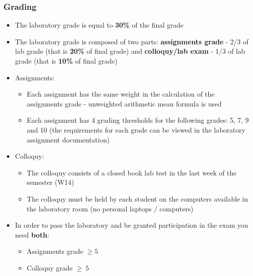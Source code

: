 \documentclass[../en-fa-lab.tex]{subfiles}
\begin{document}
\subsubsection{\texorpdfstring{\textbf{Grading}}{Grading}}\label{grading}

\begin{itemize}
\item
  The laboratory grade is equal to \textbf{30\%} of the final grade
\item
  The laboratory grade is composed of two parts: \textbf{assignments grade} - 2/3 of lab grade (that is \textbf{20\%} of final grade) and \textbf{colloquy/lab exam} - 1/3 of lab grade (that is \textbf{10\%} of final grade) 
\item Assignments:
\begin{itemize}
    \item
      Each assignment has the same weight in the calculation of the
      assignments grade - unweighted arithmetic mean formula is used
    \item
      Each assignment has 4 grading thresholds for the following grades: 5,
      7, 9 and 10 (the requirements for each grade can be viewed in the
      laboratory assignment documentation)
\end{itemize}
\item Colloquy:
\begin{itemize}
    \item The colloquy consists of a closed book lab test in the last week of the semester (W14)
    \item The colloquy must be held by each student on the computers available in the laboratory room (no personal laptops / computers) 
\end{itemize}

\item In order to pass the laboratory and be granted participation in the exam you need \textbf{both}:
\begin{itemize}
    \item Assignments grade $\geq 5$
    \item Colloquy grade $\geq\ 5$
\end{itemize}

\end{itemize}

\end{document}
